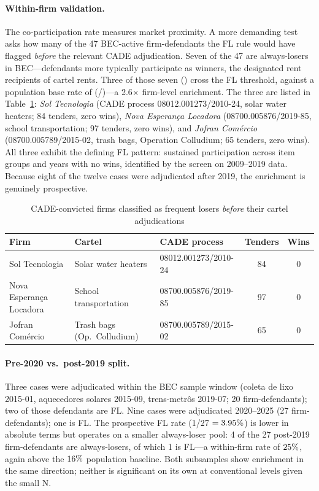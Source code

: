 \paragraph{Within-firm validation.}
The \valCobidShareFL co-participation rate measures market proximity.
A more demanding test asks how many of the 47 BEC-active
firm-defendants the FL rule would have flagged \emph{before} the
relevant CADE adjudication. Seven of the 47 are always-losers
in BEC---defendants more typically participate as winners, the
designated rent recipients of cartel rents. Three of those
seven (\valPctFortythree) cross the FL threshold, against a population base
rate of \valPctSixteenRef (\valFL/\valAlwaysLosers)---a 2.6$\times$
firm-level enrichment. The three are listed in
Table~\ref{tab:cade_fl_firms}: \emph{Sol Tecnologia} (CADE
process 08012.001273/2010-24, solar water heaters; 84 tenders,
zero wins), \emph{Nova Esperan\c{c}a Locadora} (08700.005876/2019-85,
school transportation; 97 tenders, zero wins), and \emph{Jofran
Com\'ercio} (08700.005789/2015-02, trash bags, Operation
Colludium; 65 tenders, zero wins). All three exhibit the
defining FL pattern: sustained participation across item groups
and years with no wins, identified by the screen on 2009--2019
data. Because eight of the twelve cases were adjudicated after
2019, the enrichment is genuinely prospective.

\begin{table}[htbp]
\centering
\caption{CADE-convicted firms classified as frequent losers
\emph{before} their cartel adjudications}
\label{tab:cade_fl_firms}
\small
\begin{tabular}{lllcc}
\toprule
Firm & Cartel & CADE process & Tenders & Wins \\
\midrule
Sol Tecnologia & Solar water heaters & 08012.001273/2010-24 & 84 & 0 \\
Nova Esperan\c{c}a Locadora & School transportation & 08700.005876/2019-85 & 97 & 0 \\
Jofran Com\'ercio & Trash bags (Op.\ Colludium) & 08700.005789/2015-02 & 65 & 0 \\
\bottomrule
\end{tabular}
\end{table}

\paragraph{Pre-2020 vs.\ post-2019 split.}
Three cases were adjudicated within the BEC sample window
(coleta de lixo 2015-01, aquecedores solares 2015-09,
trens-metr\^os 2019-07; 20 firm-defendants); two of those
defendants are FL. Nine cases were adjudicated 2020--2025
(27 firm-defendants); one is FL. The prospective FL rate
(1/27 $= 3.95\%$) is lower in absolute terms but operates on a
smaller always-loser pool: 4 of the 27 post-2019
firm-defendants are always-losers, of which 1 is FL---a
within-firm rate of $25\%$, again above the $16\%$ population
baseline. Both subsamples show enrichment in the same direction;
neither is significant on its own at conventional levels given
the small N.

